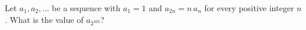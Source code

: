 Let $a_1,a_2,\dots$ be a sequence with $a_1=1$ and $a_{2n}=n\,a_n$ for every positive integer $n$. What is the value of $a_{2^{100}}$?
